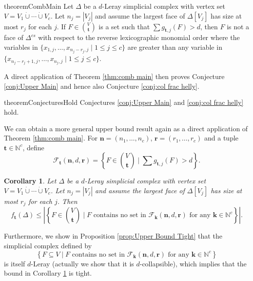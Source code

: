 \documentclass[a4paper, 10pt, reqno, english, ones]{amsart}  %
\newtheorem{corollary}[theorem]{Corollary}
\theoremstyle{definition}
\theoremstyle{remark}
\begin{document}
\begin{restatable}{theorem}{CombMain}\label{thm:comb main}
	Let $\Delta$ be a $d$-Leray simplicial complex with vertex set $V=V_1\dot{\cup} \cdots \dot{\cup} V_c$. Let $n_j=|V_j|$ and assume the largest face of $\Delta[V_j]$ has size at most $r_j$ for each $j$. If  $F\in {V \choose \mathbf{t}}$ is a set such that $\sum g_{\mathbf{t},j}(F) > d$, then $F$ is not a face of $\Delta^{cs}$ with respect to the reverse lexicographic monomial order where the variables in $\{x_{1,j},\dots,x_{n_{j}-r_{j},j}\mid 1\leq j\leq c \}$ are greater than any variable in $\{x_{n_{j}-r_{j}+1,j},\dots,x_{n_{j},j}\mid 1\leq j\leq c \}$.
\end{restatable}

A direct application of Theorem \ref{thm:comb main} then proves Conjecture \ref{conj:Upper Main} and hence also Conjecture \ref{conj:col frac helly}.

\begin{restatable}{theorem}{ConjecturesHold}
    Conjectures \ref{conj:Upper Main} and \ref{conj:col frac helly} hold.
\end{restatable}

We can obtain a more general upper bound result again as a direct application of Theorem \ref{thm:comb main}. For $\mathbf{n}=(n_1,\dots,n_c)$, $\mathbf{r}=(r_1,\dots,r_c)$ and a tuple $\mathbf{t}\in \mathbb{N}^c$, define 
\[
\mathscr{F}_{\mathbf{t}}(\mathbf{n},d,\mathbf{r}) = \left\{ F\in {V\choose \mathbf{t}} \mid \sum g_{\mathbf{t},j}(F) > d\right\}.
\]

\begin{corollary}\label{cor:gen Upper Bound}
        Let $\Delta$ be a $d$-Leray simplicial complex with vertex set $V=V_1\dot{\cup} \cdots \dot{\cup} V_c$. Let $n_j=|V_j|$ and assume the largest face of $\Delta[V_j]$ has size at most $r_j$ for each $j$. Then
        \[
        f_{\mathbf{t}}(\Delta) \leq \left|\left\{F\in {V\choose \mathbf{t}} \mid F \textrm{ contains no set in } \mathscr{F}_{\mathbf{k}}(\mathbf{n},d,\mathbf{r}) \textrm{ for any }\mathbf{k}\in \mathbb{N}^c  \right\}\right|.
        \]
\end{corollary}
\noindent Furthermore, we show in Proposition \ref{prop:Upper Bound Tight} that the simplicial complex defined by 
\[
\left\{F\subseteq {V} \mid F \textrm{ contains no set in } \mathscr{F}_{\mathbf{k}}(\mathbf{n},d,\mathbf{r}) \textrm{ for any }\mathbf{k}\in \mathbb{N}^c  \right\}
\]
is itself $d$-Leray (actually we show that it is $d$-collapsible), which implies that the bound in Corollary \ref{cor:gen Upper Bound} is tight.
\end{document}
